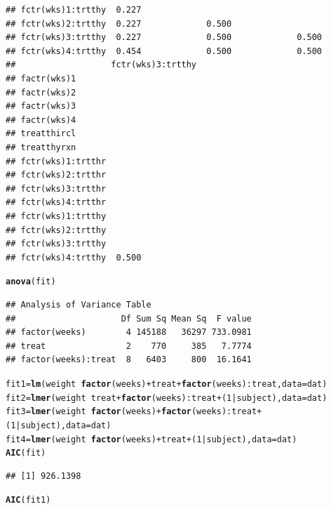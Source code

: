 \documentclass{article}\usepackage[]{graphicx}\usepackage[]{color}
\makeatletter
\newcommand{\hlnum}[1]{\textcolor[rgb]{0.686,0.059,0.569}{#1}}%
\newcommand{\hlopt}[1]{\textcolor[rgb]{0,0,0}{#1}}%
\newcommand{\hlstd}[1]{\textcolor[rgb]{0.345,0.345,0.345}{#1}}%
\newcommand{\hlkwb}[1]{\textcolor[rgb]{0.69,0.353,0.396}{#1}}%
\newcommand{\hlkwc}[1]{\textcolor[rgb]{0.333,0.667,0.333}{#1}}%
\newcommand{\hlkwd}[1]{\textcolor[rgb]{0.737,0.353,0.396}{\textbf{#1}}}%
\newenvironment{kframe}{%
 \def\at@end@of@kframe{}%
 \ifinner\ifhmode%
  \def\at@end@of@kframe{\end{minipage}}%
  \begin{minipage}{\columnwidth}%
 \fi\fi%
 \def\FrameCommand##1{\hskip\@totalleftmargin \hskip-\fboxsep
 \colorbox{shadecolor}{##1}\hskip-\fboxsep
     \hskip-\linewidth \hskip-\@totalleftmargin \hskip\columnwidth}%
 \MakeFramed {\advance\hsize-\width
   \@totalleftmargin\z@ \linewidth\hsize
   \@setminipage}}%
 {\par\unskip\endMakeFramed%
 \at@end@of@kframe}
\newenvironment{knitrout}{}{} %
\makeatother
\begin{document}
\begin{enumerate}[(a)]
\begin{knitrout}
\begin{kframe}
\begin{verbatim}
## fctr(wks)1:trtthy  0.227                                               
## fctr(wks)2:trtthy  0.227             0.500                             
## fctr(wks)3:trtthy  0.227             0.500             0.500           
## fctr(wks)4:trtthy  0.454             0.500             0.500           
##                   fctr(wks)3:trtthy
## factr(wks)1                        
## factr(wks)2                        
## factr(wks)3                        
## factr(wks)4                        
## treatthircl                        
## treatthyrxn                        
## fctr(wks)1:trtthr                  
## fctr(wks)2:trtthr                  
## fctr(wks)3:trtthr                  
## fctr(wks)4:trtthr                  
## fctr(wks)1:trtthy                  
## fctr(wks)2:trtthy                  
## fctr(wks)3:trtthy                  
## fctr(wks)4:trtthy  0.500
\end{verbatim}
\begin{alltt}
  \hlkwd{anova}\hlstd{(fit)}
\end{alltt}
\begin{verbatim}
## Analysis of Variance Table
##                     Df Sum Sq Mean Sq  F value
## factor(weeks)        4 145188   36297 733.0981
## treat                2    770     385   7.7774
## factor(weeks):treat  8   6403     800  16.1641
\end{verbatim}
\begin{alltt}
  \hlstd{fit1} \hlkwb{=} \hlkwd{lm}\hlstd{(weight} \hlopt{~} \hlkwd{factor}\hlstd{(weeks)} \hlopt{+} \hlstd{treat} \hlopt{+} \hlkwd{factor}\hlstd{(weeks)}\hlopt{:}\hlstd{treat,} \hlkwc{data} \hlstd{= dat )}
  \hlstd{fit2} \hlkwb{=} \hlkwd{lmer}\hlstd{(weight} \hlopt{~} \hlstd{treat} \hlopt{+} \hlkwd{factor}\hlstd{(weeks)}\hlopt{:}\hlstd{treat} \hlopt{+} \hlstd{(}\hlnum{1}\hlopt{|}\hlstd{subject),} \hlkwc{data} \hlstd{= dat )}
  \hlstd{fit3} \hlkwb{=} \hlkwd{lmer}\hlstd{(weight} \hlopt{~} \hlkwd{factor}\hlstd{(weeks)} \hlopt{+} \hlkwd{factor}\hlstd{(weeks)}\hlopt{:}\hlstd{treat} \hlopt{+} \hlstd{(}\hlnum{1}\hlopt{|}\hlstd{subject),} \hlkwc{data} \hlstd{= dat )}
  \hlstd{fit4} \hlkwb{=} \hlkwd{lmer}\hlstd{(weight} \hlopt{~} \hlkwd{factor}\hlstd{(weeks)} \hlopt{+} \hlstd{treat} \hlopt{+} \hlstd{(}\hlnum{1}\hlopt{|}\hlstd{subject),} \hlkwc{data} \hlstd{= dat )}
  \hlkwd{AIC}\hlstd{(fit)}
\end{alltt}
\begin{verbatim}
## [1] 926.1398
\end{verbatim}
\begin{alltt}
  \hlkwd{AIC}\hlstd{(fit1)}

\end{alltt}
\end{kframe}
\end{knitrout}
\end{enumerate}
\end{document}
